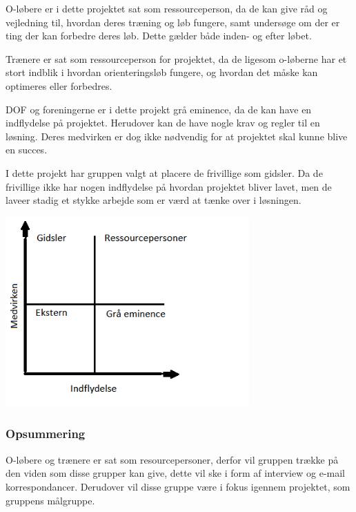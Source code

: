 O-løbere er i dette projektet sat som ressourceperson, da de kan give råd og vejledning til, hvordan deres træning og løb fungere, samt undersøge om der er ting der kan forbedre deres løb. Dette gælder både inden- og efter løbet.

Trænere er sat som ressourceperson for projektet, da de ligesom o-løberne har et stort indblik i hvordan orienteringsløb fungere, og hvordan det måske kan optimeres eller forbedres. 

DOF og foreningerne er i dette projekt grå eminence, da de kan have en indflydelse på projektet. Herudover kan de have nogle krav og regler til en løsning. Deres medvirken er dog ikke nødvendig for at projektet skal kunne blive en succes.

I dette projekt har gruppen valgt at placere de frivillige som gidsler. Da de frivillige ikke har nogen indflydelse på hvordan projektet bliver lavet, men de laveer stadig et stykke arbejde som er værd at tænke over i løsningen.    

\includegraphics[width=0.70\textwidth]{billeder/matrix}
\vspace{0.20cm}

\subsubsection{Opsummering}
O-løbere og trænere er sat som resourcepersoner, derfor vil gruppen trække på den viden som disse grupper kan give, dette vil ske i form af interview og e-mail korrespondancer. Derudover vil disse gruppe være i fokus igennem projektet, som gruppens målgruppe. 

